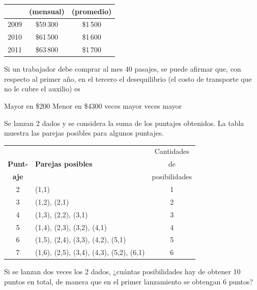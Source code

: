\documentclass[10pt,letterpaper,addpoints]{exam}
\begin{document}
\begin{multicols}{2}
\begin{questions}
\begin{center}
\begin{tabular}{|c|c|c|}
 & (mensual) & (promedio) \\ 
\hline 
2009 & \$59\,300 & \$1\,500 \\ 
\hline 
2010 & \$61\,500 & \$1\,600 \\ 
\hline 
2011 & \$63\,800 & \$1\,700 \\ 
\hline 
\end{tabular} 
\end{center}
Si un trabajador debe comprar al mes 40 pasajes, se puede afirmar que, con respecto al primer año, en el tercero el desequilibrio (el costo de transporte que no le cubre el auxilio) es
\begin{choices}
\begin{multicols}{2}
\choice Mayor en \$200
\choice Menor en \$4300
 veces mayor
 veces mayor
\end{multicols}
\end{choices}
\question Se lanzan 2 dados y se considera la suma de los puntajes obtenidos. La tabla muestra las parejas posibles para algunos puntajes.
\begin{center}
\begin{tabular}{|c|p{4cm}|c|}
\hline 
 &  & Cantidades\\
\textbf{Punt-} & \textbf{Parejas posibles} & de \\ 
\textbf{aje} &  & posibilidades \\ 
\hline 
2 & (1,1) & 1 \\ 
\hline 
3 & (1,2), (2,1) & 2 \\ 
\hline 
4 & (1,3), (2,2), (3,1) & 3 \\ 
\hline 
5 & (1,4), (2,3), (3,2), (4,1) & 4 \\ 
\hline 
6 & (1,5), (2,4), (3,3), (4,2), (5,1) & 5 \\ 
\hline 
7 & (1,6), (2,5), (3,4), (4,3), (5,2), (6,1) & 6 \\ 
\hline 
\end{tabular} 
\end{center}
Si se lanzan dos veces los 2 dados, ¿cuántas posibilidades hay de obtener 10 puntos en total, de manera que en el primer lanzamiento se obtengan 6 puntos?


\end{questions}
\end{multicols}
\end{document}
